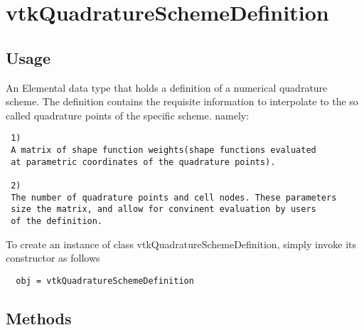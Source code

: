 \section{vtkQuadratureSchemeDefinition}

\subsection{Usage}

 An Elemental data type that holds a definition of a
 numerical quadrature scheme. The definition contains
 the requisite information to interpolate to the so called
 quadrature points of the specific scheme. namely:

 \begin{verbatim}
 1)
 A matrix of shape function weights(shape functions evaluated
 at parametric coordinates of the quadrature points).

 2)
 The number of quadrature points and cell nodes. These parameters
 size the matrix, and allow for convinent evaluation by users
 of the definition.
 \end{verbatim}

To create an instance of class vtkQuadratureSchemeDefinition, simply
invoke its constructor as follows
\begin{verbatim}
  obj = vtkQuadratureSchemeDefinition
\end{verbatim}
\subsection{Methods}

